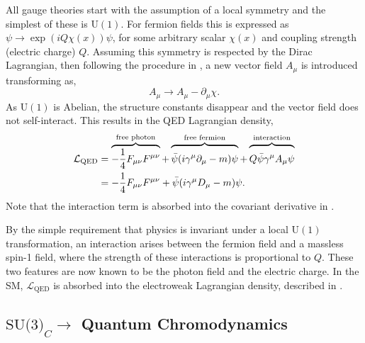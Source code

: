 All gauge theories start with the assumption of a local symmetry and the simplest of these is $\text{U}(1)$.
For fermion fields this is expressed as $\psi \rightarrow \exp{\left(i Q \chi(x)\right)} \psi$, for some arbitrary scalar $\chi(x)$ and coupling strength (electric charge) $Q$.
Assuming this symmetry is respected by the Dirac Lagrangian, then following the procedure in , a new vector field $A_\mu$ is introduced transforming as,
\begin{equation}
	\label{eq:photon_transformation}
	A_\mu \rightarrow A_\mu - \partial_\mu \chi.
\end{equation}
As $\text{U}(1)$ is Abelian, the structure constants disappear and the vector field does not self-interact.
This results in the QED Lagrangian density,
\begin{align}
	\mathcal{L}_\text{QED} & = \overbrace{-\frac{1}{4} F_{\mu\nu} F^{\mu\nu}}^{\text{free photon}}
	+ \overbrace{\vphantom{\frac{1}{1}}\bar \psi (i \gamma^\mu \partial_\mu - m) \psi}^{\text{free fermion}}
	+ \overbrace{\vphantom{\frac{1}{1}}Q \bar \psi \gamma^\mu A_\mu \psi}^{\text{interaction}}               \\
	                       & = -\frac{1}{4} F_{\mu\nu} F^{\mu\nu} + \bar \psi (i \gamma^\mu D_\mu - m) \psi.
	\label{eq:qed_lagrangian}
\end{align}
Note that the interaction term is absorbed into the covariant derivative in .

By the simple requirement that physics is invariant under a local $\text{U}(1)$ transformation, an interaction arises between the fermion field and a massless spin-1 field, where the strength of these interactions is proportional to $Q$.
These two features are now known to be the photon field and the electric charge.
In the SM, $\mathcal{L}_\text{QED}$ is absorbed into the electroweak Lagrangian density, described in .

\subsection{\texorpdfstring{$\text{SU(3)}_C\rightarrow$}{SU(3)-} Quantum Chromodynamics}
\label{sec:qcd}

